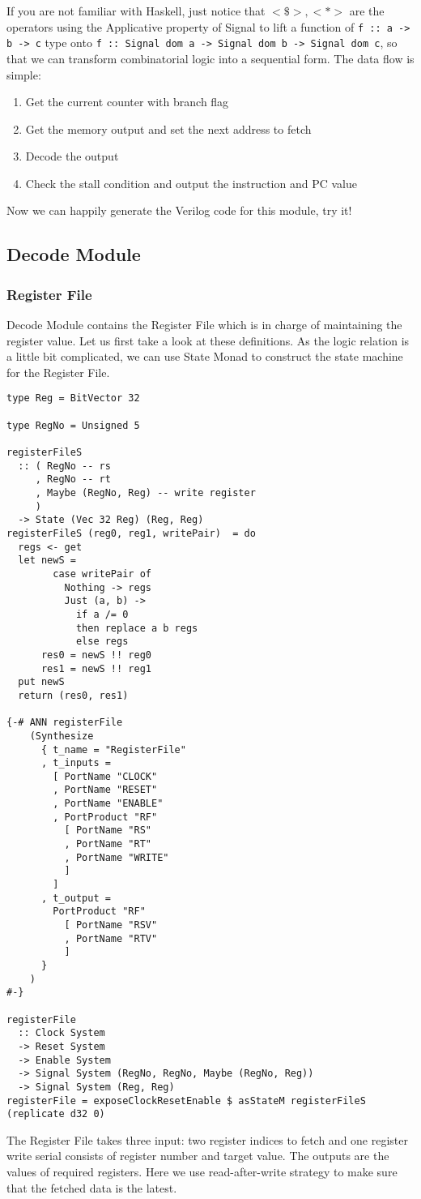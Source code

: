 If you are not familiar with Haskell, just notice that $<\$>, <*>$ are the operators using the Applicative property of Signal to lift a function of \texttt{f :: a -> b -> c} type onto \texttt{f :: Signal dom a -> Signal dom b -> Signal dom c}, so that we can transform combinatorial logic into a sequential form.
The data flow is simple:
\begin{enumerate}
	\item Get the current counter with branch flag
	\item Get the memory output and set the next address to fetch
	\item Decode the output
	\item Check the stall condition and output the instruction and PC value
\end{enumerate}
Now we can happily generate the Verilog code for this module, try it!

\subsection{Decode Module}
\subsubsection{Register File}
Decode Module contains the Register File which is in charge of maintaining the register value. Let us first take a look at these definitions.
As the logic relation is a little bit complicated, we can use State Monad to construct the state machine for the Register File.
\begin{verbatim}
type Reg = BitVector 32

type RegNo = Unsigned 5

registerFileS 
  :: ( RegNo -- rs
     , RegNo -- rt
     , Maybe (RegNo, Reg) -- write register
     )
  -> State (Vec 32 Reg) (Reg, Reg)
registerFileS (reg0, reg1, writePair)  = do
  regs <- get
  let newS =
        case writePair of
          Nothing -> regs
          Just (a, b) ->
            if a /= 0
            then replace a b regs
            else regs
      res0 = newS !! reg0
      res1 = newS !! reg1
  put newS
  return (res0, res1)

{-# ANN registerFile
    (Synthesize
      { t_name = "RegisterFile"
      , t_inputs =
        [ PortName "CLOCK"
        , PortName "RESET"
        , PortName "ENABLE"
        , PortProduct "RF" 
          [ PortName "RS"
          , PortName "RT"
          , PortName "WRITE"
          ]
        ]
      , t_output = 
        PortProduct "RF" 
          [ PortName "RSV"
          , PortName "RTV"
          ]
      }
    )
#-}

registerFile 
  :: Clock System
  -> Reset System
  -> Enable System
  -> Signal System (RegNo, RegNo, Maybe (RegNo, Reg))
  -> Signal System (Reg, Reg)
registerFile = exposeClockResetEnable $ asStateM registerFileS (replicate d32 0)
\end{verbatim}
The Register File takes three input: two register indices to fetch and one register write serial consists of register number and target value. The outputs are the values of required registers. Here we use read-after-write strategy to make sure that the fetched data is the latest.

